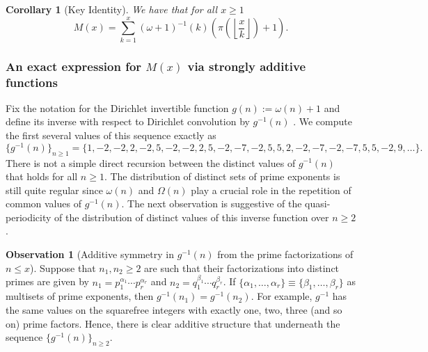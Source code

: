 \documentclass[11pt,reqno,a4letter]{article}
\numberwithin{figure}{section}
\numberwithin{table}{section}
\newcommand{\seqnum}[1]{\href{http://oeis.org/#1}{\color{ProcessBlue}{\underline{#1}}}}
\newcommand{\Floor}[2]{\ensuremath{\left\lfloor \frac{#1}{#2} \right\rfloor}}
\theoremstyle{plain}
\newtheorem{cor}[theorem]{Corollary}
\numberwithin{theorem}{section}
\theoremstyle{definition}
\newtheorem{observation}[theorem]{Observation}
\begin{document}
\begin{cor}[Key Identity] 
\label{cor_Mx_gInvnPixk_formula} 
We have that for all $x \geq 1$ 
\begin{equation} 
\label{eqn_Mx_gInvnPixk_formula} 
M(x) = \sum_{k=1}^{x} (\omega+1)^{-1}(k) \left(\pi\left(\Floor{x}{k}\right) + 1\right). 
\end{equation} 
\end{cor} 

\subsubsection{An exact expression for $M(x)$ via strongly additive functions} 
\label{example_InvertingARecRelForMx_Intro}

Fix the notation for the Dirichlet invertible function $g(n) := \omega(n) + 1$ and define its 
inverse with respect to Dirichlet convolution by $g^{-1}(n)$ 
\cite[\seqnum{A341444}]{OEIS}. 
We compute the first several values of this sequence exactly as 
\[
\{g^{-1}(n)\}_{n \geq 1} = \{1, -2, -2, 2, -2, 5, -2, -2, 2, 5, -2, -7, -2, 5, 5, 2, -2, -7, -2, 
     -7, 5, 5, -2, 9, \ldots \}. 
\] 
There is not a simple 
direct recursion between the distinct values of $g^{-1}(n)$ that holds for all $n \geq 1$. 
The distribution of distinct sets of prime exponents is still quite regular since 
$\omega(n)$ and $\Omega(n)$ play a crucial role in the repetition of common values of 
$g^{-1}(n)$. 
The next observation is suggestive of the quasi-periodicity of the distribution of 
distinct values of this inverse function over $n \geq 2$. 

\begin{observation}[Additive symmetry in $g^{-1}(n)$ from the prime factorizations of $n \leq x$] 
\label{heuristic_SymmetryIngInvFuncs} 
Suppose that $n_1, n_2 \geq 2$ are such that their factorizations into distinct primes are 
given by $n_1 = p_1^{\alpha_1} \cdots p_r^{\alpha_r}$ and $n_2 = q_1^{\beta_1} \cdots q_r^{\beta_r}$. 
If $\{\alpha_1, \ldots, \alpha_r\} \equiv \{\beta_1, \ldots, \beta_r\}$ as multisets of prime exponents, 
then $g^{-1}(n_1) = g^{-1}(n_2)$. For example, $g^{-1}$ has the same values on the squarefree integers 
with exactly one, two, three (and so on) prime factors. 
Hence, there is clear additive structure that underneath the sequence 
$\{g^{-1}(n)\}_{n \geq 2}$. 
\end{observation} 
\end{document}
